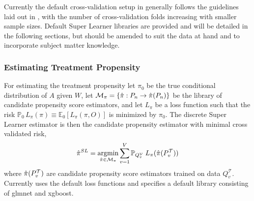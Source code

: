 \documentclass{report}
\DeclareMathOperator*{\argmin}{argmin}
\newcommand{\1}{\ensuremath{\mathbf{1}}}
\newcommand{\X}{\ensuremath{{W}}}
\newcommand{\g}{\ensuremath{\pi}}
\begin{document}
Currently the default cross-validation setup in  generally follows the guidelines laid out in \cite{phillips_practical_2022}, with the number of cross-validation folds increasing with smaller sample sizes. Default Super Learner libraries are provided and will be detailed in the following sections, but should be amended to suit the data at hand and to incorporate subject matter knowledge.

\subsubsection{Estimating Treatment Propensity}
\label{trtps-est}
For estimating the treatment propensity let \(\g_0\) be the true conditional distribution of \(A\) given \(\X\), let
\(\mathcal{M}_{\g} = \left\{\Hat{\g} : P_n \to \Hat{\g}(P_n)\right\}\)
be the library of candidate propensity score estimators, and let \(L_\g\) be a loss function such that the risk \(\mathbb{P}_0\,L_\g(\g) \equiv \mathbb{E}_0\left[L_\g(\g, O)\right]\) is minimized by \(\g_0\). The discrete Super Learner estimator is then the candidate propensity estimator with minimal cross validated risk, 
\begin{equation}
\Hat{\g}^{SL} = \argmin_{\Hat{\g} \in \mathcal{M}_\g} \sum_{v = 1}^{V} \mathbb{P}_{Q^\mathcal{V}_v} \; L_\g(\Hat{\g}(P^\mathcal{T}_v)) \label{propsl}
\end{equation}
where \(\Hat{\g}(P^\mathcal{T}_v)\) are candidate propensity score estimators trained on data \(Q^\mathcal{T}_v\). Currently  uses the default  loss functions and specifies a default library consisting of glmnet and xgboost.
\end{document}
